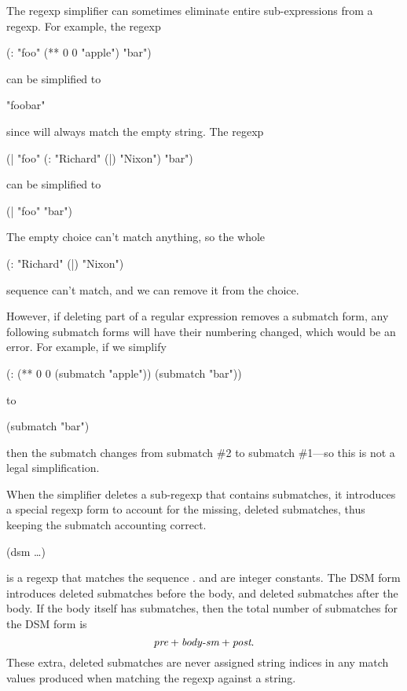The regexp simplifier can sometimes eliminate entire sub-expressions from a
regexp. For example, the regexp
\begin{code}
(: "foo" (** 0 0 "apple") "bar")\end{code}%
%
can be simplified to
\begin{code}
"foobar"\end{code}%
%
since  will always match the empty string. The regexp
\begin{code}
(| "foo"
   (: "Richard" (|) "Nixon")
   "bar")\end{code}%
%
can be simplified to
\begin{code}
(| "foo" "bar")\end{code}%
%
The empty choice \ex{(|)} can't match anything, so the whole
\begin{code}
(: "Richard" (|) "Nixon")\end{code}%
%
sequence can't match, and we can remove it from the choice.

However, if deleting part of a regular expression removes a submatch
form, any following submatch forms will have their numbering changed,
which would be an error. For example, if we simplify
\begin{code}
(: (** 0 0 (submatch "apple"))
   (submatch "bar"))\end{code}%
%
to
\begin{code}
(submatch "bar")\end{code}%
%
then the  submatch changes from submatch \#2 to submatch \#1---so 
this is not a legal simplification.

When the simplifier deletes a sub-regexp that contains submatches,
it introduces a special regexp form to account for the missing,
deleted submatches, thus keeping the submatch accounting correct.
\begin{code}
(dsm    \ldots)\end{code}%
%
is a regexp that matches the sequence . 
 and  are integer constants.
The DSM form introduces  deleted
submatches before the body, and  deleted submatches after the
body. 
If the body  itself has  submatches,
then the total number of submatches for the DSM form is
                  $$\var{pre} + \var{body-sm} + \var{post}.$$
These extra, deleted submatches are never assigned string indices in any
match values produced when matching the regexp against a string.


